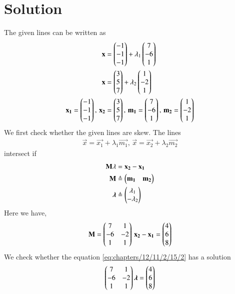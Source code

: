 \documentclass[journal,12pt,twocolumn]{IEEEtran}
\begin{document}
\section{Solution}
\fi
 The given lines  can be written as
\begin{align}
\mathbf{x} &= \begin{pmatrix}-1\\-1\\-1\end{pmatrix} + \lambda_1\begin{pmatrix}7\\-6\\1\end{pmatrix}\\
\mathbf{x} &= \begin{pmatrix}3\\5\\7\end{pmatrix} + \lambda_2\begin{pmatrix}1\\-2\\1\end{pmatrix} \\
\mathbf{x_1} = \begin{pmatrix}-1\\-1\\-1\end{pmatrix},\, \mathbf{x_2} &= \begin{pmatrix}3\\5\\7\end{pmatrix}, \,\mathbf{m_1} = \begin{pmatrix}7\\-6\\1\end{pmatrix}, \, \mathbf{m_2} = \begin{pmatrix}1\\-2\\1\end{pmatrix}
\end{align}
%
We first check whether the given lines are skew. The lines 
\begin{align}
\vec{x} = \vec{x_1} + \lambda_1\vec{m_1},\, \vec{x} = \vec{x_2} + \lambda_2\vec{m_2} 
\label{eq:chapters/12/11/2/15/1}
\end{align}
intersect if
\begin{align}
\mathbf{M}{\lambda} &= \mathbf{x_2} - \mathbf{x_1}\\
\mathbf{M} &\triangleq \begin{pmatrix}\mathbf{m_1} & \mathbf{m_2}\end{pmatrix} \\
\bm{\lambda} &\triangleq \begin{pmatrix}\lambda_1\\-\lambda_2\end{pmatrix}\\
\end{align}
Here we have,
\begin{align}
\mathbf{M} = \begin{pmatrix}7&1\\-6&-2\\1&1\end{pmatrix}\,
\mathbf{x_2} - \mathbf{x_1} = \begin{pmatrix}4\\6\\8\end{pmatrix}
\end{align}
We check whether the equation \eqref{eq:chapters/12/11/2/15/2} has a solution
\begin{align}
\begin{pmatrix}7&1\\-6&-2\\1&1\end{pmatrix}\bm{\lambda} = \begin{pmatrix}4\\6\\8\end{pmatrix}
\label{eq:chapters/12/11/2/15/2}
\end{align}
\end{document}

